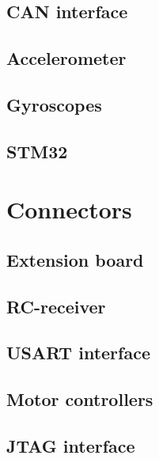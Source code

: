 \documentclass[11pt, a4paper]{article}
\begin{document}

\subsection{CAN interface} %
\label{sub:CAN interface}


\subsection{Accelerometer} %
\label{sub:Accelerometer}


\subsection{Gyroscopes} %
\label{sub:Gyroscopes}


\subsection{STM32} %
\label{sub:STM32}


\section{Connectors} %
\label{sec:Connectors}

\subsection{Extension board} %
\label{sub:Extension board}


\subsection{RC-receiver} %
\label{sub:RC-receiver}


\subsection{USART interface} %
\label{sub:USART interface}


\subsection{Motor controllers} %
\label{sub:Motor controllers}


\subsection{JTAG interface} %
\label{sub:JTAG interface}

\end{document}

